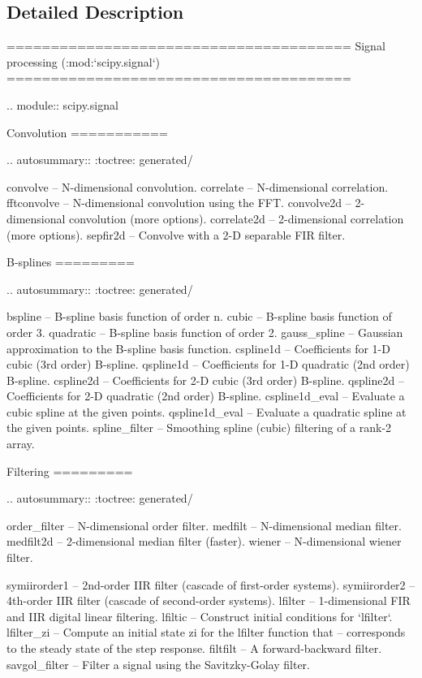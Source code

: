 \subsection{Detailed Description}
\begin{DoxyVerb}=======================================
Signal processing (:mod:`scipy.signal`)
=======================================

.. module:: scipy.signal

Convolution
===========

.. autosummary::
   :toctree: generated/

   convolve    -- N-dimensional convolution.
   correlate   -- N-dimensional correlation.
   fftconvolve -- N-dimensional convolution using the FFT.
   convolve2d  -- 2-dimensional convolution (more options).
   correlate2d -- 2-dimensional correlation (more options).
   sepfir2d    -- Convolve with a 2-D separable FIR filter.

B-splines
=========

.. autosummary::
   :toctree: generated/

   bspline        -- B-spline basis function of order n.
   cubic          -- B-spline basis function of order 3.
   quadratic      -- B-spline basis function of order 2.
   gauss_spline   -- Gaussian approximation to the B-spline basis function.
   cspline1d      -- Coefficients for 1-D cubic (3rd order) B-spline.
   qspline1d      -- Coefficients for 1-D quadratic (2nd order) B-spline.
   cspline2d      -- Coefficients for 2-D cubic (3rd order) B-spline.
   qspline2d      -- Coefficients for 2-D quadratic (2nd order) B-spline.
   cspline1d_eval -- Evaluate a cubic spline at the given points.
   qspline1d_eval -- Evaluate a quadratic spline at the given points.
   spline_filter  -- Smoothing spline (cubic) filtering of a rank-2 array.

Filtering
=========

.. autosummary::
   :toctree: generated/

   order_filter  -- N-dimensional order filter.
   medfilt       -- N-dimensional median filter.
   medfilt2d     -- 2-dimensional median filter (faster).
   wiener        -- N-dimensional wiener filter.

   symiirorder1  -- 2nd-order IIR filter (cascade of first-order systems).
   symiirorder2  -- 4th-order IIR filter (cascade of second-order systems).
   lfilter       -- 1-dimensional FIR and IIR digital linear filtering.
   lfiltic       -- Construct initial conditions for `lfilter`.
   lfilter_zi    -- Compute an initial state zi for the lfilter function that
             -- corresponds to the steady state of the step response.
   filtfilt      -- A forward-backward filter.
   savgol_filter -- Filter a signal using the Savitzky-Golay filter.


\end{DoxyVerb}
